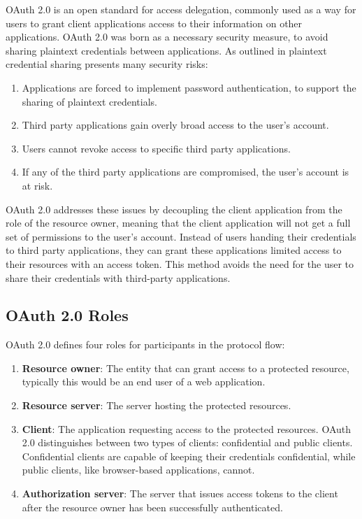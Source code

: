 OAuth 2.0 is an open standard for access delegation,
commonly used as a way for users to grant client applications access to their information on other applications.
OAuth 2.0 was born as a necessary security measure, to avoid sharing plaintext credentials between applications.
As outlined in \cite{rfcOAuth2} plaintext credential sharing presents many security risks:

\begin{enumerate}
	\item Applications are forced to implement password authentication, to support the sharing of plaintext credentials.
	\item Third party applications gain overly broad access to the user's account.
	\item Users cannot revoke access to specific third party applications.
	\item If any of the third party applications are compromised, the user's account is at risk.
\end{enumerate}

OAuth 2.0 addresses these issues by decoupling the client application from the role of the resource owner,
meaning that the client application will not get a full set of permissions to the user's account.
Instead of users handing their credentials to third party applications,
they can grant these applications limited access to their resources with an access token. 
This method avoids the need for the user to share their credentials with third-party applications.

\subsection{OAuth 2.0 Roles}

OAuth 2.0 defines four roles for participants in the protocol flow:

\begin{enumerate}
  \item \textbf{Resource owner}: The entity that can grant access to a protected resource, typically this would be an end user of a web application.
  \item \textbf{Resource server}: The server hosting the protected resources.
  \item \textbf{Client}: The application requesting access to the protected resources.
	      OAuth 2.0 distinguishes between two types of clients: confidential and public clients.
	      Confidential clients are capable of keeping their credentials confidential, while public clients, like browser-based applications, cannot.
  \item \textbf{Authorization server}: The server that issues access tokens to the client after the resource owner has been successfully authenticated.
\end{enumerate}

